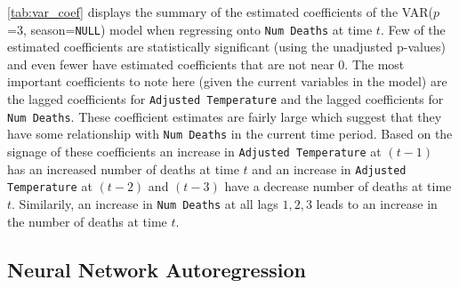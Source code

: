 \documentclass{article}\usepackage[]{graphicx}\usepackage[]{color}
\begin{document}
\autoref{tab:var_coef} displays the summary of the estimated coefficients of the VAR($p$=3, season=\texttt{NULL}) model when regressing onto \texttt{Num Deaths} at time $t$. Few of the estimated coefficients are statistically significant (using the unadjusted p-values) and even fewer have estimated coefficients that are not near 0. The most important coefficients to note here (given the current variables in the model) are the lagged coefficients for \texttt{Adjusted Temperature} and the lagged coefficients for \texttt{Num Deaths}. These coefficient estimates are fairly large which suggest that they have some relationship with \texttt{Num Deaths} in the current time period. Based on the signage of these coefficients an increase in \texttt{Adjusted Temperature} at $(t - 1)$ has an increased number of deaths at time $t$ and an increase in \texttt{Adjusted Temperature} at $(t-2)$ and $(t-3)$ have a decrease number of deaths at time $t$. Similarily, an increase in \texttt{Num Deaths} at all lags $1, 2, 3$ leads to an increase in the number of deaths at time $t$.

\subsection{Neural Network Autoregression} \label{ssec:NNAR}
\end{document}
